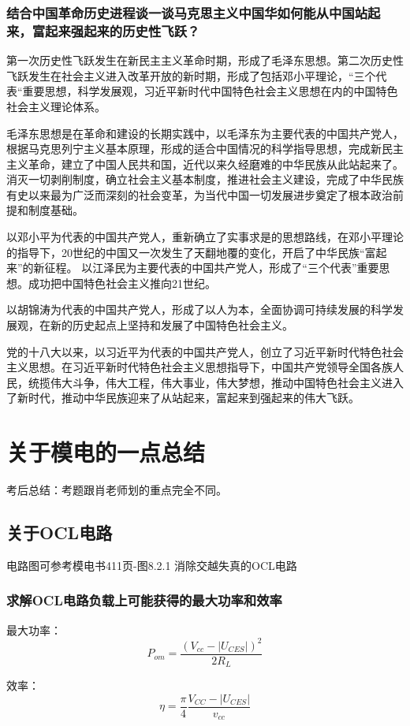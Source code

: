\documentclass[cn,11pt]{elegantbook}
\begin{document}
\subsection{结合中国革命历史进程谈一谈马克思主义中国华如何能从中国站起来，富起来强起来的历史性飞跃？}
{\large 
第一次历史性飞跃发生在新民主主义革命时期，形成了毛泽东思想。第二次历史性飞跃发生在社会主义进入改革开放的新时期，形成了包括邓小平理论，“三个代表“重要思想，科学发展观，习近平新时代中国特色社会主义思想在内的中国特色社会主义理论体系。

毛泽东思想是在革命和建设的长期实践中，以毛泽东为主要代表的中国共产党人，根据马克思列宁主义基本原理，形成的适合中国情况的科学指导思想，完成新民主主义革命，建立了中国人民共和国，近代以来久经磨难的中华民族从此站起来了。
消灭一切剥削制度，确立社会主义基本制度，推进社会主义建设，完成了中华民族有史以来最为广泛而深刻的社会变革，为当代中国一切发展进步奠定了根本政治前提和制度基础。

以邓小平为代表的中国共产党人，重新确立了实事求是的思想路线，在邓小平理论的指导下，20世纪的中国又一次发生了天翻地覆的变化，开启了中华民族“富起来”的新征程。
以江泽民为主要代表的中国共产党人，形成了“三个代表”重要思想。成功把中国特色社会主义推向21世纪。

以胡锦涛为代表的中国共产党人，形成了以人为本，全面协调可持续发展的科学发展观，在新的历史起点上坚持和发展了中国特色社会主义。

党的十八大以来，以习近平为代表的中国共产党人，创立了习近平新时代特色社会主义思想。在习近平新时代特色社会主义思想指导下，中国共产党领导全国各族人民，统揽伟大斗争，伟大工程，伟大事业，伟大梦想，推动中国特色社会主义进入了新时代，推动中华民族迎来了从站起来，富起来到强起来的伟大飞跃。

}
\chapter{关于模电的一点总结}
考后总结：考题跟肖老师划的重点完全不同。
\section{关于OCL电路}
电路图可参考模电书411页-图8.2.1 消除交越失真的OCL电路
\subsection{求解OCL电路负载上可能获得的最大功率和效率}
{\large 最大功率：}
$$P_{om}=\dfrac{(V_{cc}-|U_{CES}|)^{2}}{2R_{L}}$$

{\large 效率：}
$$\eta=\dfrac{\pi}{4}\dfrac{V_{CC}-|U_{CES}|}{v_{cc}}$$
\end{document}
